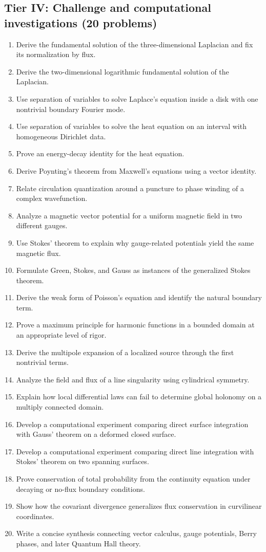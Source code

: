 \subsection*{Tier IV: Challenge and computational investigations (20 problems)}
\begin{enumerate}[label=\textbf{\arabic*.},leftmargin=*]
\item Derive the fundamental solution of the three-dimensional Laplacian and fix its normalization by flux.
\item Derive the two-dimensional logarithmic fundamental solution of the Laplacian.
\item Use separation of variables to solve Laplace's equation inside a disk with one nontrivial boundary Fourier mode.
\item Use separation of variables to solve the heat equation on an interval with homogeneous Dirichlet data.
\item Prove an energy-decay identity for the heat equation.
\item Derive Poynting's theorem from Maxwell's equations using a vector identity.
\item Relate circulation quantization around a puncture to phase winding of a complex wavefunction.
\item Analyze a magnetic vector potential for a uniform magnetic field in two different gauges.
\item Use Stokes' theorem to explain why gauge-related potentials yield the same magnetic flux.
\item Formulate Green, Stokes, and Gauss as instances of the generalized Stokes theorem.
\item Derive the weak form of Poisson's equation and identify the natural boundary term.
\item Prove a maximum principle for harmonic functions in a bounded domain at an appropriate level of rigor.
\item Derive the multipole expansion of a localized source through the first nontrivial terms.
\item Analyze the field and flux of a line singularity using cylindrical symmetry.
\item Explain how local differential laws can fail to determine global holonomy on a multiply connected domain.
\item Develop a computational experiment comparing direct surface integration with Gauss' theorem on a deformed closed surface.
\item Develop a computational experiment comparing direct line integration with Stokes' theorem on two spanning surfaces.
\item Prove conservation of total probability from the continuity equation under decaying or no-flux boundary conditions.
\item Show how the covariant divergence generalizes flux conservation in curvilinear coordinates.
\item Write a concise synthesis connecting vector calculus, gauge potentials, Berry phases, and later Quantum Hall theory.
\end{enumerate}

